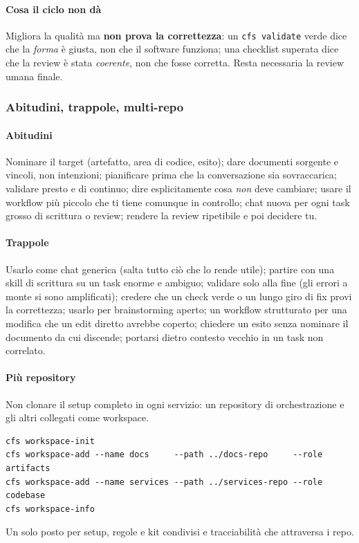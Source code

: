 \documentclass[a4paper,12pt]{article}
\begin{document}
\paragraph{Cosa il ciclo non dà} Migliora la qualità ma \textbf{non prova la
correttezza}: un \texttt{cfs validate} verde dice che la \emph{forma} è giusta, non che il
software funziona; una checklist superata dice che la review è stata \emph{coerente}, non
che fosse corretta. Resta necessaria la review umana finale.

\subsubsection{Abitudini, trappole, multi-repo}

\paragraph{Abitudini} Nominare il target (artefatto, area di codice, esito); dare
documenti sorgente e vincoli, non intenzioni; pianificare prima che la conversazione sia
sovraccarica; validare presto e di continuo; dire esplicitamente cosa \emph{non} deve
cambiare; usare il workflow più piccolo che ti tiene comunque in controllo; chat nuova per
ogni task grosso di scrittura o review; rendere la review ripetibile e poi decidere tu.

\paragraph{Trappole} Usarlo come chat generica (salta tutto ciò che lo rende utile);
partire con una skill di scrittura su un task enorme e ambiguo; validare solo alla fine
(gli errori a monte si sono amplificati); credere che un check verde o un lungo giro di
fix provi la correttezza; usarlo per brainstorming aperto; un workflow strutturato per una
modifica che un edit diretto avrebbe coperto; chiedere un esito senza nominare il documento
da cui discende; portarsi dietro contesto vecchio in un task non correlato.

\paragraph{Più repository} Non clonare il setup completo in ogni servizio: un repository
di orchestrazione e gli altri collegati come workspace.
\begin{verbatim}
cfs workspace-init
cfs workspace-add --name docs     --path ../docs-repo     --role artifacts
cfs workspace-add --name services --path ../services-repo --role codebase
cfs workspace-info
\end{verbatim}
Un solo posto per setup, regole e kit condivisi e tracciabilità che attraversa i repo.
\end{document}
